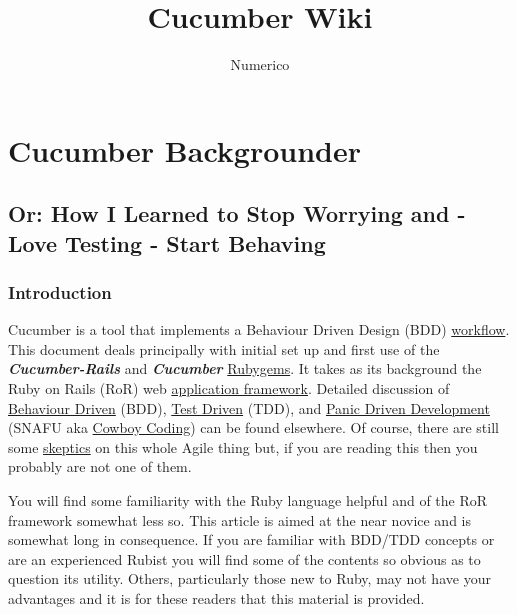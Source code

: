 \documentclass[10pt]{book}
\title{Cucumber Wiki}
\author{Numerico}
\begin{document}
\tableofcontents

\footnotesize

\chapter{Cucumber Backgrounder}

\section{Or: How I Learned to Stop Worrying and - Love Testing - Start Behaving}

\subsection{Introduction}

Cucumber is a tool that implements a Behaviour Driven Design (BDD) \href{http://en.wikipedia.org/wiki/Workflow}{workflow}.  This document deals principally with initial set up and first use of the \textbf{\emph{ Cucumber-Rails}} and \textbf{\emph{Cucumber}} \href{http://en.wikipedia.org/wiki/RubyGems}{Rubygems}. It takes as its background the Ruby on Rails (RoR) web \href{http://en.wikipedia.org/wiki/Framework}{application framework}.  Detailed discussion of \href{http://en.wikipedia.org/wiki/Behavior_driven_development}{Behaviour Driven} (BDD), \href{http://en.wikipedia.org/wiki/Test-driven_development}{Test Driven} (TDD), and \href{http://en.wikipedia.org/wiki/SNAFU}{Panic Driven Development} (SNAFU aka \href{http://cowboyprogramming.com/2007/01/11/delving-into-cowboy-programming/}{Cowboy Coding}) can be found elsewhere.  Of course, there are still some \href{http://steve-yegge.blogspot.ca/2006/09/good-agile-bad-agile_27.html}{skeptics} on this whole Agile thing but, if you are reading this then you probably are not one of them.

You will find some familiarity with the Ruby language helpful and of the RoR framework somewhat less so.  This article is aimed at the near novice and is somewhat long in consequence.  If you are familiar with BDD/TDD concepts or are an experienced Rubist you will find some of the contents so obvious as to question its utility.  Others, particularly those new to Ruby, may not have your advantages and it is for these readers that this material is provided.
\end{document}
